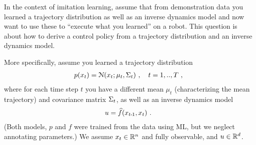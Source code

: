 

\renewcommand{\course}{Robot Learning}
\renewcommand{\coursepicture}{roblearn.png}
\renewcommand{\coursedate}{Summer 2024}
\renewcommand{\exnum}{Weekly Exercise 4}

\renewcommand{\teacher}{Marc Toussaint \& Wolfgang H{\"o}nig}
\renewcommand{\addressTUB}{
  Learning~\&~Intelligent~Systems Lab, Intelligent Multi-Robot Coordination Lab, TU~Berlin\\\small
  Marchstr. 23, 10587 Berlin, Germany
}

\exercises

\ifthenelse{\isundefined{\scripthead}}{
  \usepackage{tikz}
}{}


\exercisestitle



In the context of imitation learning, assume that from demonstration data you learned a trajectory distribution as well as an inverse dynamics model and now want to use these to ``execute what you learned'' on a robot. This question is about how to derive a control policy from a trajectory distribution and an inverse dynamics model.

More specifically, assume you learned a trajectory distribution
\begin{align}
p(x_t) = \NN(x_t; \mu_t, \S_t) \comma t=1,..,T ~,
\end{align}
where for each time step $t$ you have a different mean $\mu_t$ (characterizing
the mean trajectory) and covariance matrix $\S_t$, as well as an inverse dynamics model
\begin{align}
u = \hat f(x_{t\1}, x_t) ~.
\end{align}
(Both models, $p$ and $f$ were trained from the data using ML, but we neglect annotating parameters.) We assume $x_t\in\RRR^n$ and fully observable, and $u\in\RRR^d$.


